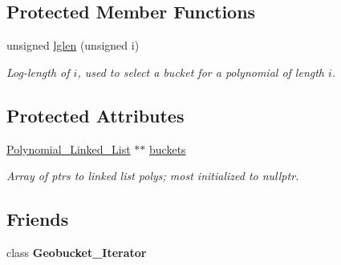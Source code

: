 \subsection*{Protected Member Functions}
\begin{DoxyCompactItemize}
\item 
\mbox{\label{class_polynomial___geobucket_a82e8a9286f5c30e48c13e05d74af7fb9}} 
unsigned \hyperlink{class_polynomial___geobucket_a82e8a9286f5c30e48c13e05d74af7fb9}{lglen} (unsigned i)
\begin{DoxyCompactList}\small\item\em Log-\/length of $i$, used to select a bucket for a polynomial of length $i$. \end{DoxyCompactList}\end{DoxyCompactItemize}
\subsection*{Protected Attributes}
\begin{DoxyCompactItemize}
\item 
\mbox{\label{class_polynomial___geobucket_abfbb6cf257943fb08e03ea4601cf3134}} 
\hyperlink{class_polynomial___linked___list}{Polynomial\+\_\+\+Linked\+\_\+\+List} $\ast$$\ast$ \hyperlink{class_polynomial___geobucket_abfbb6cf257943fb08e03ea4601cf3134}{buckets}
\begin{DoxyCompactList}\small\item\em Array of ptrs to linked list polys; most initialized to {\ttfamily nullptr}. \end{DoxyCompactList}\end{DoxyCompactItemize}
\subsection*{Friends}
\begin{DoxyCompactItemize}
\item 
\mbox{\label{class_polynomial___geobucket_a45580077827a8fdbd6d2fabdbb2a2d7f}} 
class {\bfseries Geobucket\+\_\+\+Iterator}
\end{DoxyCompactItemize}
